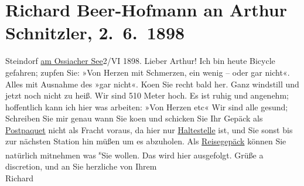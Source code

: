 

               \section[Richard Beer-Hofmann an Arthur Schnitzler, 2. 6. 1898]{ Richard Beer-Hofmann an Arthur Schnitzler, 2. 6. 1898}\nopagebreak{}\rehead{ }\begin{ledgroupsized}[t]{13cm}\normalsize\beginnumbering{} \toendnotes[C]{\smallbreak\pagebreak[2]} 
\pstart
           \raggedleft{}{\pb}Steindorf \uline{am Ossiacher
                        See}2/VI 1898.\pend
           \pstart
           Lieber Arthur! Ich bin heute Bicycle gefahren; zupfen Sie: »Von
               Herzen mit Schmerzen, ein wenig – oder gar nicht«. Alles mit Ausnahme des »gar
               nicht«. Ko{\geminationm}en Sie recht bald her. Ganz windstill und
               jetzt noch nicht zu heiß. Wir sind 510 Meter hoch. Es ist ruhig und ange{\pb}nehm; hoffentlich kann ich hier was
               arbeiten: »Von Herzen etc«\pend
           \pstart
           Wir sind alle gesund; Schreiben Sie mir genau wann Sie ko{\geminationm}en und schicken Sie Ihr Gepäck als \uline{Postpaquet} nicht
               als Fracht voraus, da hier nur \uline{Haltestelle} ist, und
               Sie sonst bis zur nächsten Station {\pb} hin müßen um es abzuholen. Als \uline{Reisegepäck} können Sie natürlich mitnehmen was \substVorne{}\textsuperscript{s}\substDazwischen{}S\substHinten{}ie wollen. Das wird hier ausgefolgt. Grüße a discretion, und an Sie herzliche
               von\pend
           \pstart
           Ihrem{\\}Richard\pend
           \endnumbering{}\end{ledgroupsized}  \newcommand{\dateiname}{L00799}\newcommand{\titel}{Richard Beer-Hofmann an Arthur Schnitzler, 2. 6. 1898}\newcommand{\editorInnen}{Martin Anton Müller und Gerd-Hermann Susen}
      